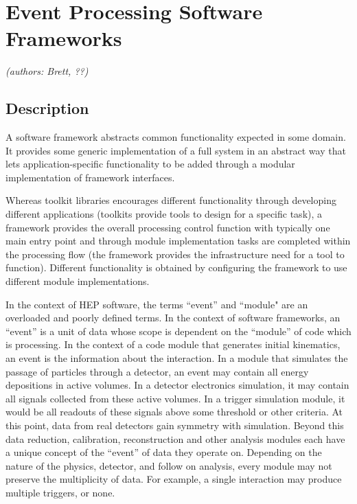 \section{Event Processing Software Frameworks}
\textit{(authors: Brett, ??)}

\subsection{Description}

A software framework abstracts common functionality expected in some
domain.  It provides some generic implementation of a full system in
an abstract way that lets application-specific functionality to be
added through a modular implementation of framework interfaces.

Whereas toolkit libraries encourages different functionality through
developing different applications (toolkits provide tools to design for a specific task), a framework provides the overall
processing control function with typically one main entry point and through module implementation tasks are completed within the processing flow (the framework provides the infrastructure need for a tool to function).
Different functionality is obtained by configuring the framework to
use different module implementations.

In the context of HEP software, the terms ``event'' and ``module" are an overloaded and poorly defined terms.
In the context of software frameworks, an ``event'' is a unit of data whose scope is dependent
on the ``module'' of code which is processing.  In the context of a
code module that generates initial kinematics, an event is the
information about the interaction.  In a module that simulates the
passage of particles through a detector, an event may contain all
energy depositions in active volumes.  In a detector electronics
simulation, it may contain all signals collected from these active
volumes.  In a trigger simulation module, it would be all readouts of
these signals above some threshold or other criteria.  At this point,
data from real detectors gain symmetry with simulation.  Beyond this
data reduction, calibration, reconstruction and other analysis modules
each have a unique concept of the ``event'' of data they operate on.
Depending on the nature of the physics, detector, and follow on
analysis, every module may not preserve the multiplicity of data.  For
example, a single interaction may produce multiple triggers, or none.

